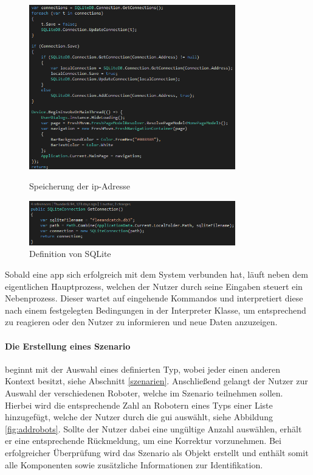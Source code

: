 \begin{figure}[h]
	\begin{center}
		\includegraphics[width=0.8\textwidth]{images/implementation/authorization.png}
	\end{center}	
	\caption{Speicherung der \gls{ip}-Adresse}
	\label{fig:saveip}
	\begin{center}
		\includegraphics[width=0.8\textwidth]{images/implementation/sqlite.png}
	\end{center}	
	\caption{Definition von SQLite}
	\label{fig:sqlite}
\end{figure}

\noindent
Sobald eine \gls{app} sich erfolgreich mit dem System verbunden hat, läuft neben dem eigentlichen Hauptprozess, welchen der Nutzer durch seine Eingaben steuert ein Nebenprozess. Dieser wartet auf eingehende Kommandos und interpretiert diese nach einem festgelegten Bedingungen in der Interpreter Klasse, um entsprechend zu reagieren oder den Nutzer zu informieren und neue Daten anzuzeigen.

\paragraph{Die Erstellung eines Szenario} beginnt mit der Auswahl eines definierten Typ, wobei jeder einen anderen Kontext besitzt, siehe Abschnitt \eqref{szenarien}. Anschließend gelangt der Nutzer zur Auswahl der verschiedenen Roboter, welche im Szenario teilnehmen sollen. Hierbei wird die entsprechende Zahl an Robotern eines Typs einer Liste hinzugefügt, welche der Nutzer durch die \gls{gui} auswählt, siehe Abbildung \eqref{fig:addrobots}. Sollte der Nutzer dabei eine ungültige Anzahl auswählen, erhält er eine entsprechende Rückmeldung, um eine Korrektur vorzunehmen. Bei erfolgreicher Überprüfung wird das Szenario als Objekt erstellt und enthält somit alle Komponenten sowie zusätzliche Informationen zur Identifikation.

